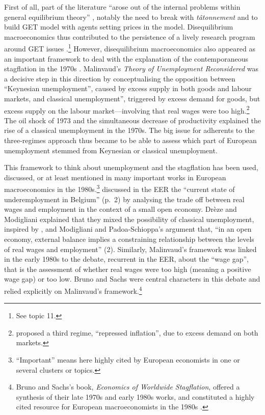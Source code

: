 \documentclass[]{elsarticle} %
\begin{document}
First of all, part of the literature ``arose out of the internal
problems within general equilibrium theory''
\citep[105]{backhouseboianovski2013}, notably the need to break with
\emph{tâtonnement} and to build GET model with agents setting prices in
the model. Disequilibrium macroeconomics thus contributed to the
persistence of a lively research program around GET issues .\footnote{See
  topic 11.} However, disequilibrium macroeconomics also appeared as an
important framework to deal with the explanation of the contemporaneous
stagflation in the 1970s \citep[chapter 8]{backhouseboianovski2013}.
Malinvaud's \emph{Theory of Unemployment Reconsidered}
\citeyearpar{malinvaud1977} was a decisive step in this direction by
conceptualising the opposition between ``Keynesian unemployment'',
caused by excess supply in both goods and labour markets, and classical
unemployment'', triggered by excess demand for goods, but excess supply
on the labour market---involving that real wages were too
high.\footnote{\citet{malinvaud1977} proposed a third regime,
  ``repressed inflation'', due to excess demand on both markets.} The
oil shock of 1973 and the simultaneous decrease of productivity
explained the rise of a classical unemployment in the 1970s. The big
issue for adherents to the three-regimes approach thus became to be able
to assess which part of European unemployment stemmed from Keynesian or
classical unemployment.

This framework to think about unemployment and the stagflation has been
used, discussed, or at least mentioned in many important works in
European macroeconomics in the 1980s.\footnote{``Important'' means here
  highly cited by European economists in one or several clusters or
  topics.} \citet{dreze1981} discussed in the EER the ``current state of
underemployment in Belgium'' (p.~2) by analysing the trade off between
real wages and employment in the context of a small open economy. Drèze
and Modigliani explained that they mixed the possibility of classical
unemployment, inspired by \citet{malinvaud1977}, and Modigliani and
Padoa-Schioppa's argument that, ``in an open economy, external balance
implies a constraining relationship between the levels of real wages and
employment'' (2). Similarly, Malinvaud's framework was linked in the
early 1980s to the debate, recurrent in the EER, about the ``wage gap'',
that is the assessment of whether real wages were too high (meaning a
positive wage gap) or too low. Bruno and Sachs were central characters
in this debate and relied explicitly on Malinvaud's
framework.\footnote{Bruno and Sachs's \citeyearpar{brunosachs1985} book,
  \emph{Economics of Worldwide Stagflation}, offered a synthesis of
  their late 1970s and early 1980s works, and constituted a highly cited
  resource for European macroeconomists in the 1980s \citep[see
  also][section 3]{goutsmedt2021}.}
\end{document}
